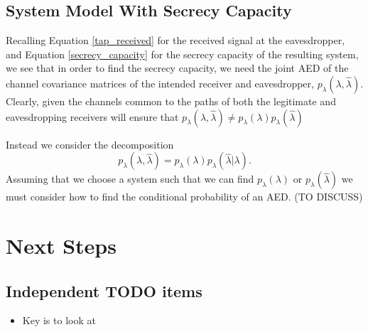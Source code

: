 \documentclass[12pt,a4paper]{report}
\begin{document}
\section{System Model With Secrecy Capacity}
Recalling Equation \eqref{tap_received} for the received signal at the eavesdropper,  and Equation \eqref{secrecy_capacity} for the secrecy capacity of the resulting system, we see that in order to find the secrecy capacity, we need the joint AED of the channel covariance matrices of the intended receiver and eavesdropper, $p_{\lambda}(\lambda,\hat{\lambda})$. Clearly, given the channels common to the paths of both the legitimate and eavesdropping receivers will ensure that $p_{\lambda}(\lambda,\hat{\lambda}) \neq p_{\lambda}(\lambda)p_{\lambda}(\hat{\lambda})$
\par
Instead we consider the decomposition 
\begin{equation}
p_{\lambda}(\lambda,\hat{\lambda}) = p_{\lambda}(\lambda)p_{\lambda}(\hat{\lambda}|\lambda).
\end{equation}
Assuming that we choose a system such that we can find $ p_{\lambda}(\lambda)$ or  $p_{\lambda}(\hat{\lambda})$ we must consider how to find the conditional probability of an AED. (TO DISCUSS)



\chapter{Next Steps}
\section{Independent TODO items}
\begin{itemize}
\item Key is to look at 
\end{itemize}
\end{document}
